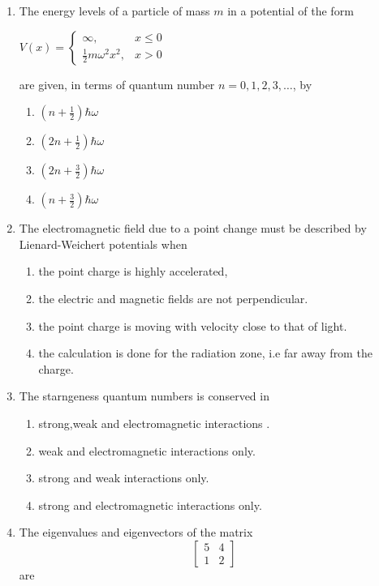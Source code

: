 \documentclass[journal]{IEEEtran}
\begin{document}
\begin{enumerate}
\item  The energy levels of a particle of mass $m$ in a potential of the form

$
V(x) =
\begin{cases} 
\infty, & x \leq 0 \\
\frac{1}{2} m \omega^2 x^2, & x > 0
\end{cases} $

are given, in terms of quantum number $n = 0, 1, 2, 3, \dots$, by

\begin{enumerate}
\item $ \left(n + \frac{1}{2}\right)\hbar\omega \quad $
\item $ \left(2n + \frac{1}{2}\right)\hbar\omega \quad $
\item $ \left(2n + \frac{3}{2}\right)\hbar\omega \quad $
\item $ \left(n + \frac{3}{2}\right)\hbar\omega $
\end{enumerate}

\item The electromagnetic field due to a point change must be described by Lienard-Weichert potentials when 
\begin{enumerate}
    \item  the point charge is highly accelerated,
\item the electric and magnetic fields are not perpendicular.
\item the point charge is moving with velocity close to that of light.
\item the calculation is done for the radiation zone, i.e far away from the charge.
\end{enumerate}
\item The starngeness quantum numbers is conserved in 
\begin{enumerate}
\item strong,weak and electromagnetic interactions .
    \item weak and electromagnetic interactions only.
    \item strong and weak interactions only.
    \item strong and electromagnetic interactions only.
\end{enumerate}
\item The eigenvalues and eigenvectors of the matrix 
\[
\begin{bmatrix}
5 & 4 \\
1 & 2
\end{bmatrix}
\]
are


\end{enumerate}
\end{document}
